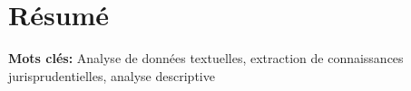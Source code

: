 \chapter*{Résumé}

\textbf{Mots clés:} Analyse de données textuelles, extraction de connaissances jurisprudentielles, analyse descriptive

